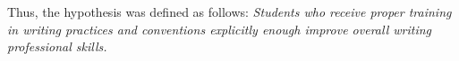  

Thus, the hypothesis was defined as follows:
\textit{Students who receive proper training in writing practices and conventions explicitly enough improve overall writing professional skills.}
